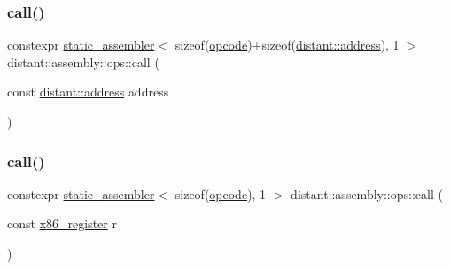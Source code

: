 \mbox{\label{namespacedistant_1_1assembly_1_1ops_ac78a868958995be12d1ecf14b88d288d}} 
\subsubsection{\texorpdfstring{call()}{call()}\hspace{0.1cm}{\footnotesize\ttfamily [1/2]}}
{\footnotesize\ttfamily constexpr \mbox{\hyperlink{classdistant_1_1assembly_1_1static__assembler}{static\+\_\+assembler}}$<$ sizeof(\mbox{\hyperlink{namespacedistant_1_1assembly_a64d7b047d9e3df1ac04919f7c4f8f6fa}{opcode}})+sizeof(\mbox{\hyperlink{namespacedistant_a9d7aa6e07cb2f50321e29c209f9a7886}{distant\+::address}}), 1 $>$ distant\+::assembly\+::ops\+::call (\begin{DoxyParamCaption}\item[{const \mbox{\hyperlink{namespacedistant_a9d7aa6e07cb2f50321e29c209f9a7886}{distant\+::address}}}]{address }\end{DoxyParamCaption})\hspace{0.3cm}{\ttfamily [noexcept]}}

\mbox{\label{namespacedistant_1_1assembly_1_1ops_aec6718183f68739e47dcfb73bae8c46b}} 
\subsubsection{\texorpdfstring{call()}{call()}\hspace{0.1cm}{\footnotesize\ttfamily [2/2]}}
{\footnotesize\ttfamily constexpr \mbox{\hyperlink{classdistant_1_1assembly_1_1static__assembler}{static\+\_\+assembler}}$<$ sizeof(\mbox{\hyperlink{namespacedistant_1_1assembly_a64d7b047d9e3df1ac04919f7c4f8f6fa}{opcode}}), 1 $>$ distant\+::assembly\+::ops\+::call (\begin{DoxyParamCaption}\item[{const \mbox{\hyperlink{namespacedistant_1_1assembly_a873d3faa0111fc5605de36beaaaafb3e}{x86\+\_\+register}}}]{r }\end{DoxyParamCaption})}

\mbox{\label{namespacedistant_1_1assembly_1_1ops_a7da3edc9fb30aef020088257e153a8ac}} 
